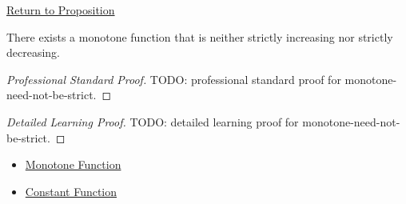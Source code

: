 \newpage
{}
\label{prf:monotone-need-not-be-strict}

\begin{remark*}[Return]
\hyperref[prop:monotone-need-not-be-strict]{Return to Proposition}
\end{remark*}

\begin{proposition*}
There exists a monotone function that is neither strictly increasing nor strictly decreasing.
\end{proposition*}

\begin{proof}[Professional Standard Proof]
\LRAProofBodyStart
TODO: professional standard proof for monotone-need-not-be-strict.
\end{proof}

\begin{proof}[Detailed Learning Proof]
\LRAProofBodyStart
TODO: detailed learning proof for monotone-need-not-be-strict.
\end{proof}

\begin{remark*}
\end{remark*}

\begin{dependencies}
\begin{itemize}
  \item \hyperref[def:function-monotone]{Monotone Function}
  \item \hyperref[def:function-constant]{Constant Function}
\end{itemize}
\end{dependencies}

\clearpage
